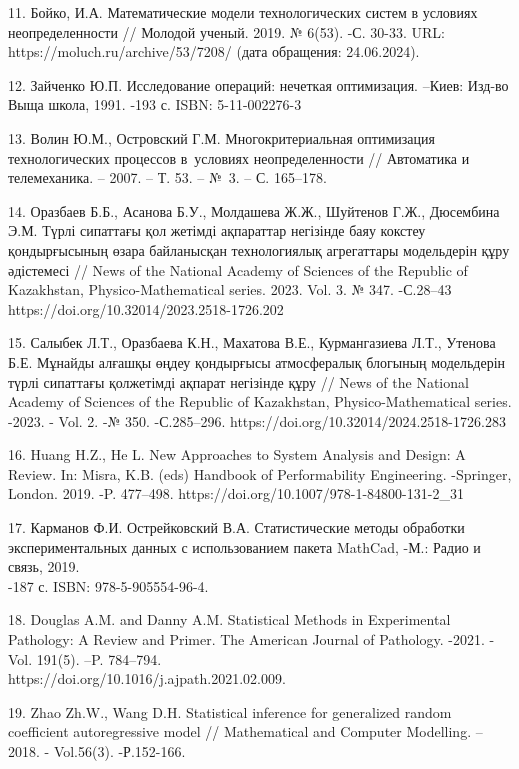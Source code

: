 \begin{noparindent}
11. Бойко, И.А. Математические модели технологических систем в условиях
неопределенности // Молодой ученый. 2019. № 6(53). -С. 30-33. URL:
https://moluch.ru/archive/53/7208/ (дата обращения: 24.06.2024).

12. Зайченко Ю.П. Исследование операций: нечеткая оптимизация. --Киев:
Изд-во Выща школа, 1991. -193 с. ISBN: 5-11-002276-3

13. Волин Ю.М., Островский Г.М. Многокритериальная оптимизация
технологических процессов в~условиях неопределенности // Автоматика и
телемеханика. -- 2007. -- Т. 53. -- №~3. -- С. 165--178.

14. Оразбаев Б.Б., Асанова Б.У., Молдашева Ж.Ж., Шуйтенов Г.Ж.,
Дюсембина Э.М. Түрлі сипаттағы қол жетімді ақпараттар негізінде баяу
кокстеу қондырғысының өзара байланысқан технологиялық агрегаттары
модельдерін құру әдістемесі // News of the National Academy of Sciences
of the Republic of Kazakhstan, Physico-Mathematical series. 2023. Vol.
3. № 347. -С.28--43\\ https://doi.org/10.32014/2023.2518-1726.202

15. Салыбек Л.Т., Оразбаева К.Н., Махатова В.Е., Курмангазиева Л.Т.,
Утенова Б.Е. Мұнайды алғашқы өңдеу қондырғысы атмосфералық блогының
модельдерін түрлі сипаттағы қолжетімді ақпарат негізінде құру // News of
the National Academy of Sciences of the Republic of Kazakhstan,
Physico-Mathematical series. -2023. - Vol. 2. -№ 350. -С.285--296.
https://doi.org/10.32014/2024.2518-1726.283

16. Huang H.Z., He L. New Approaches to System Analysis and Design: A
Review. In: Misra, K.B. (eds) Handbook of Performability Engineering.
-Springer, London. 2019. -P. 477--498.
https://doi.org/10.1007/978-1-84800-131-2\_31

17. Карманов Ф.И. Острейковский В.А. Статистические методы обработки
экспериментальных данных с использованием пакета MathCad, -М.: Радио и
связь, 2019.\\
-187 с. ISBN: 978-5-905554-96-4.

18. Douglas A.M. and Danny A.M. Statistical Methods in Experimental
Pathology: A Review and Primer. The American Journal of Pathology.
-2021. -Vol. 191(5). --P. 784--794. \\
https://doi.org/10.1016/j.ajpath.2021.02.009.

19. Zhao Zh.W., Wang D.H. Statistical inference for generalized random
coefficient autoregressive model // Mathematical and Computer Modelling.
-- 2018. - Vol.56(3). -Р.152-166.


\end{noparindent}
